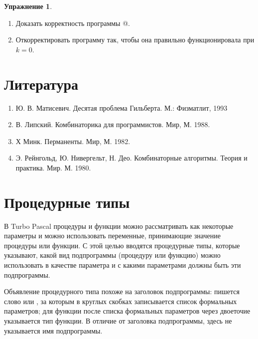 \documentclass[12pt,a4paper]{article}
\theoremstyle{plain}
\theoremstyle{definition}
\newtheorem*{task}{Упражнение}
\theoremstyle{remark}
\newtheorem*{comment}{Комментарий}
\begin{document}
\begin{comment}
Стек реализуется таким же способом, как в \verb@SET4@. \verb@t[1]@ указывает на узел в вершине стека, и каждый элемент \verb@t[j]@ в стеке немедленно получает новое значение, как только он исключается из стека. Присваивания \verb@{1}@ и \verb@{2}@ служат для добавления в стек $m-1,\ldots,h+1$.
\end{comment}

\begin{task}
~\\
\begin{enumerate}
\item Доказать корректность программы @.
\item Откорректировать программу так, чтобы она правильно функционировала при $k=0$.
\end{enumerate}
\end{task}

\section*{Литература}
\begin{enumerate}
\item Ю. В. Матисевич. Десятая проблема Гильберта. М.: Физматлит, 1993
\item В. Липский. Комбинаторика для программистов. Мир, М. 1988.
\item Х Минк. Перманенты. Мир, М. 1982.
\item Э. Рейнгольд, Ю. Нивергельт, Н. Део. Комбинаторные алгоритмы. Теория и
практика. Мир. М. 1980.
\end{enumerate}

\section{Процедурные типы}

В Turbo Pascal процедуры и функции можно рассматривать как некоторые параметры и можно использовать переменные, принимающие значение процедуры или функции. С этой целью вводятся процедурные типы, которые указывают, какой вид подпрограммы (процедуру или функцию) можно использовать в качестве параметра и с какими параметрами должны быть эти подпрограммы.

Объявление процедурного типа похоже на заголовок подпрограммы: пишется слово \verb@procedure@ или \verb@function@, за которым в круглых скобках записывается список формальных параметров; для функции после списка формальных параметров через двоеточие указывается тип функции. В отличие от заголовка подпрограммы, здесь не указывается имя подпрограммы.
\end{document}
